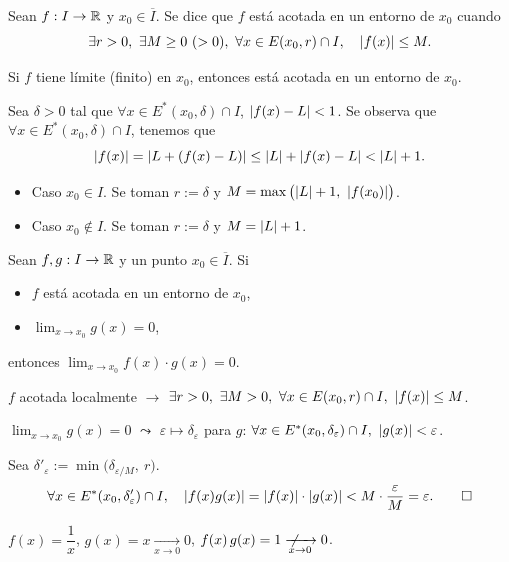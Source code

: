 \documentclass[11pt,a4paper]{article}
\newcommand{\Er}{E^{*}}                 %
\newcommand{\Cl}[1]{\overline{#1}}      %
\begin{document}
\begin{definicion}
Sean $f:I\to\mathbb{R}$ y $x_0\in\Cl{I}$. Se dice que $f$ está acotada en un entorno de $x_0$ cuando
\[
  \exists r>0,\ \exists M\geq 0\ (>0),\ \forall x\in E(x_0,r)\cap I,\quad \abs{f(x)}\leq M.
\]
\end{definicion}

\begin{lema}
Si $f$ tiene límite (finito) en $x_0$, entonces está acotada en un entorno de $x_0$.
\end{lema}

\begin{demo}
Sea $\delta>0$ tal que $\forall x\in\Er(x_0,\delta)\cap I$, $\lvert f(x)-L\rvert<1$. Se observa que $\forall x\in\Er(x_0,\delta)\cap I$, tenemos que
\[
  \lvert f(x)\rvert = \lvert L+(f(x)-L)\rvert \leq \lvert L\rvert+\lvert f(x)-L\rvert < \lvert L\rvert+1.
\]
\begin{itemize}
  \item Caso $x_0\in I$. Se toman $r:=\delta$ y $M=\max\big(\abs{L}+1,\ \abs{f(x_0)}\big)$.
  \item Caso $x_0\notin I$. Se toman $r:=\delta$ y $M=\lvert L\rvert+1$. \qedhere
\end{itemize}
\end{demo}

\begin{proposicion}
Sean $f,g:I\to\mathbb{R}$ y un punto $x_0\in\Cl{I}$. Si
\begin{itemize}
  \item $f$ está acotada en un entorno de $x_0$,
  \item $\displaystyle\lim_{x\to x_0}g(x)=0$,
\end{itemize}
entonces $\displaystyle\lim_{x\to x_0}f(x)\cdot g(x)=0$.
\end{proposicion}

\begin{demo}
$f$ acotada localmente $\to$ $\exists r>0,\ \exists M>0,\ \forall x\in E(x_0,r)\cap I,\ \lvert f(x)\rvert\leq M$.

$\displaystyle\lim_{x\to x_0}g(x)=0$ $\leadsto$ $\varepsilon\mapsto\delta_\varepsilon$ para $g$: $\forall x\in\Er(x_0,\delta_\varepsilon)\cap I,\ \abs{g(x)}<\varepsilon$.

Sea $\delta'_\varepsilon := \min\big(\delta_{\varepsilon/M},\ r\big)$.
\[
  \forall x\in\Er(x_0,\delta'_\varepsilon)\cap I,\quad \abs{f(x)g(x)} = \abs{f(x)}\cdot\abs{g(x)} < M\cdot\frac{\varepsilon}{M} = \varepsilon. \qedhere
\]
\end{demo}

\begin{contraejemplo}[$I=\R^+$]
$f(x)=\dfrac1x$, \quad $g(x)=x\xrightarrow[x\to0]{}0$, \quad $f(x)\,g(x)=1\ \not\!\!\xrightarrow[x\to0]{}0$.
\end{contraejemplo}
\end{document}
